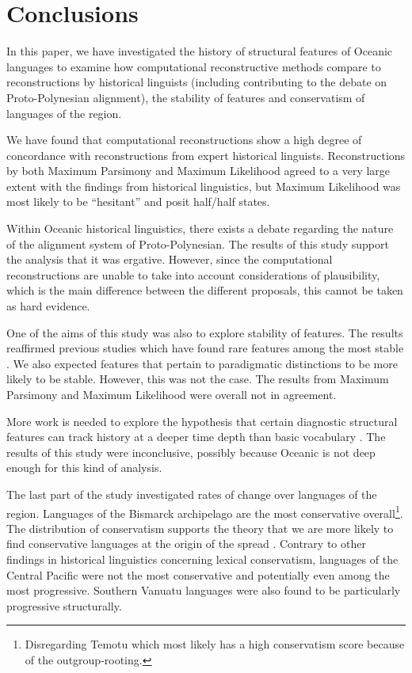 \documentclass[draft,10pt]{article} %
\begin{document}
%

\section{Conclusions}
In this paper, we have investigated the history of structural features of Oceanic languages to examine how computational reconstructive methods compare to reconstructions by historical linguists (including contributing to the debate on Proto-Polynesian alignment), the stability of features and conservatism of languages of the region.

We have found that computational reconstructions show a high degree of concordance with reconstructions from expert historical linguists. Reconstructions by both Maximum Parsimony and Maximum Likelihood agreed to a very large extent with the findings from historical linguistics, but Maximum Likelihood was most likely to be ``hesitant'' and posit half/half states.

Within Oceanic historical linguistics, there exists a debate regarding the nature of the alignment system of Proto-Polynesian. The results of this study support the analysis that it was ergative. However, since the computational reconstructions are unable to take into account considerations of plausibility, which is the main difference between the different proposals, this cannot be taken as hard evidence.

One of the aims of this study was also to explore stability of features. The results reaffirmed previous studies which have found rare features among the most stable \citep{dediu2013some}. We also expected features that pertain to paradigmatic distinctions to be more likely to be stable. However, this was not the case. The results from Maximum Parsimony and Maximum Likelihood were overall not in agreement.

More work is needed to explore the hypothesis that certain diagnostic structural features can track history at a deeper time depth than basic vocabulary \citep[c.f.][]{nichols1998origin}. The results of this study were inconclusive, possibly because Oceanic is not deep enough for this kind of analysis.

The last part of the study investigated rates of change over languages of the region. Languages of the Bismarck archipelago are the most conservative overall\footnote{Disregarding Temotu which most likely has a high conservatism score because  of the outgroup-rooting.}. The distribution of conservatism supports the theory that we are more likely to find conservative languages at the origin of the spread  \citep[119]{lynchrosscrowleyinternalsubgroupingoceanic}. Contrary to other findings in historical linguistics concerning lexical conservatism, languages of the Central Pacific were not the most conservative and potentially even among the most progressive. Southern Vanuatu languages were also found to be particularly progressive structurally.
\end{document}

